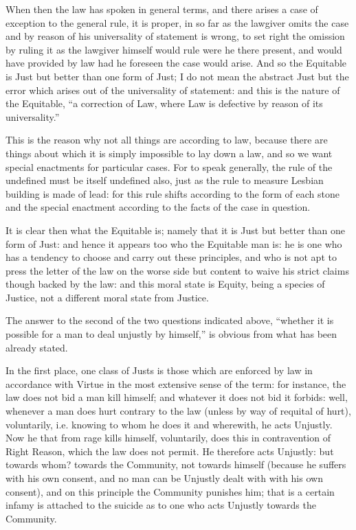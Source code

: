 When then the law has spoken in general terms, and there arises a case of
exception to the general rule, it is proper, in so far as the lawgiver omits
the case and by reason of his universality of statement is wrong, to set right
the omission by ruling it as the lawgiver himself would rule were he there
present, and would have provided by law had he foreseen the case would arise.
And so the Equitable is Just but better than one form of Just; I do not mean
the abstract Just but the error which arises out of the universality of
statement: and this is the nature of the Equitable, “a correction of Law,
where Law is defective by reason of its universality.”

This is the reason why not all things are according to law, because there are
things about which it is simply impossible to lay down a law, and so we want
special enactments for particular cases. For to speak generally, the rule of
the undefined must be itself undefined also, just as the rule to measure
Lesbian building is made of lead: for this rule shifts according to the form of
each stone and the special enactment according to the facts of the case in
question.

It is clear then what the Equitable is; namely that it is Just but better than
one form of Just: and hence it appears too who the Equitable man is: he is one
who has a tendency to choose and carry out these principles, and who is not apt
to press the letter of the law on the worse side but content to waive his
strict claims though backed by the law: and this moral state is Equity, being a
species of Justice, not a different moral state from Justice.


The answer to the second of the two questions indicated above, “whether
it is possible for a man to deal unjustly by himself,” is obvious from
what has been already stated.

In the first place, one class of Justs is those which are enforced by law in
accordance with Virtue in the most extensive sense of the term: for instance,
the law does not bid a man kill himself; and whatever it does not bid it
forbids: well, whenever a man does hurt contrary to the law (unless by way of
requital of hurt), voluntarily, i.e. knowing to whom he does it and wherewith,
he acts Unjustly. Now he that from rage kills himself, voluntarily, does this
in contravention of Right Reason, which the law does not permit. He therefore
acts Unjustly: but towards whom? towards the Community, not towards himself
(because he suffers with his own consent, and no man can be Unjustly dealt with
with his own consent), and on this principle the Community punishes him; that
is a certain infamy is attached to the suicide as to one who acts Unjustly
towards the Community.

